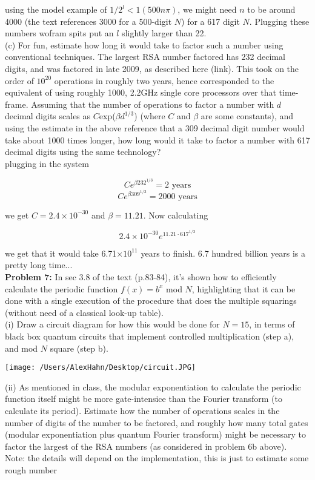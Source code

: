 using the model example of $1/2^l<1(500n\pi)$,  we might
need $n$ to be around 4000 (the text references 3000 for a 500-digit $N$) for
a 617 digit $N$. Plugging  these numbers wofram spits put an $l$ slightly
larger than 22.\\

(c) For fun, estimate how long it would take to factor such a number using
conventional techniques. The largest RSA number factored has 232 decimal
digits, and was factored in late 2009, as described here (link). This took on
the order of $10^{20}$ operations in roughly two years, hence corresponded to
the equivalent of using roughly 1000, 2.2GHz single core processors over
that time-frame. Assuming that the number of operations to factor a number
with $d$ decimal digits scales as $C$exp($\beta d^{1/3}$) (where $C$ and
$\beta$ are some constants), and using the estimate in the above reference
that a 309 decimal digit number would take about 1000 times longer, how long
would it take to factor a number with 617 decimal digits using the same
technology?\\

plugging in the system

$$Ce^{\beta232^{1/3}}=2\text{ years}$$
$$Ce^{\beta309^{1/3}}=2000\text{ years}$$

we get $C=2.4\times 10^{-30}$ and $\beta=11.21$. Now calculating

$$2.4\times10^{-30}e^{11.21\cdot617^{1/3}}$$

we get that it would take 6.71$\times10^{11}$ years to finish. 6.7 hundred
billion years is a pretty long time...\\

\textbf{Problem 7:} In sec 3.8 of the text (p.83-84), it's shown how to
efficiently calculate the periodic function $f(x)=b^x$ mod $N$, highlighting
that it can be done with a single execution of the procedure that does the
multiple squarings (without need of a classical look-up table).\\

(i) Draw a circuit diagram for how this would be done for $N=15$, in terms of
black box quantum circuits that implement controlled multiplication (step a),
and mod $N$ square (step b).\\

\begin{center}
\texttt{[image: /Users/AlexHahn/Desktop/circuit.JPG]}
\end{center}

(ii) As mentioned in class, the modular exponentiation to calculate the
periodic function itself might be more gate-intensice than the Fourier
transform (to calculate its period). Estimate how the number of operations
scales in the number of digits of the number to be factored, and roughly how
many total gates (modular exponentiation plus quantum Fourier transform)
might be necessary to factor the largest of the RSA numbers (as considered in
problem 6b above).\\
Note: the details will depend on the implementation, this is just to
estimate some rough number\\


